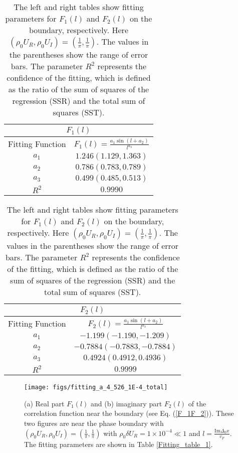 \documentclass[aps,onecolumn,nofootinbib,superscriptaddress,notitlepage,longbibliography]{revtex4-1}
\begin{document}
\begin{table}
	\begin{tabular}{|c|c|}
		\hline 
		\multicolumn{2}{|c|}{$F_{1}(l)$}\tabularnewline
		\hline
		\hline 
		Fitting Function & $F_1(l)=\frac{a_{1}\sin(l+a_{2})}{l^{a_{3}}}$\tabularnewline
		\hline 
		$a_{1}$ & $1.246(1.129,1.363)$\tabularnewline
		\hline 
		$a_{2}$ & $0.786(0.783,0.789)$\tabularnewline
		\hline 
		$a_{3}$ & $0.499(0.485,0.513)$\tabularnewline
		\hline 
		$R^{2}$ & $0.9990$\tabularnewline
		\hline 
	\end{tabular}%
	\begin{tabular}{|c|c|}
		\hline 
		\multicolumn{2}{|c|}{$F_{2}(l)$}\tabularnewline
		\hline 
		\hline
		Fitting Function & $F_{2}(l)=\frac{a_{1}\sin(l+a_{2})}{l^{a_{3}}}$\tabularnewline
		\hline 
		$a_{1}$ & $-1.199(-1.190,-1.209)$\tabularnewline
		\hline 
		$a_{2}$ & $-0.7884(-0.7883,-0.7884)$\tabularnewline
		\hline 
		$a_{3}$ & $0.4924(0.4912,0.4936)$\tabularnewline
		\hline 
		$R^{2}$ & $0.9999$\tabularnewline
		\hline 
	\end{tabular}
	
	\caption{The left and right tables show fitting parameters for $F_1(l)$ and $F_2(l)$ on the boundary, respectively. Here $(\rho_{0}U_{R},\rho_{0}U_{I})=(\frac{1}{\pi},\frac{1}{\pi})$. The values in the parentheses show the range of error bars. The parameter $R^2$ represents the confidence of the fitting, which is defined as the ratio of the sum of squares of the regression (SSR) and the total sum of squares (SST).}
	
	\label{fitting_table_2}
\end{table}
\begin{figure}[t]
	\centering \texttt{[image: figs/fitting\_a\_4\_526\_1E-4\_total]}
	\caption{(a) Real part $F_1(l)$ and (b) imaginary part $F_2(l)$ of the correlation function near the boundary (see Eq. (\ref{F_1F_2})). These two figures are near the phase boundary with $(\rho_{0}U_{R},\rho_{0}U_{I})=(\frac{1}{\pi},\frac{1}{\pi})$ with $\rho_{0}\delta U_{R}=1\times10^{-4}\ll1$ and $l=\frac{\text{Im}\Delta_0x}{v_F}.$ The fitting parameters are shown in Table \ref{Fitting_table_1}.}
	\label{fig1}
\end{figure}
\end{document}
